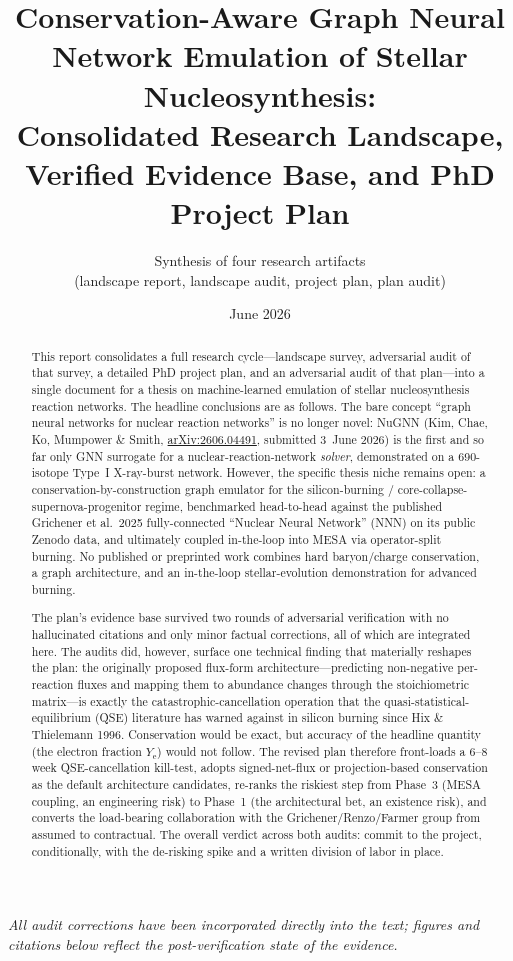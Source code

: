 \documentclass[11pt,a4paper]{article}
\title{\textbf{Conservation-Aware Graph Neural Network Emulation of Stellar Nucleosynthesis:}\\[0.4em]
\large Consolidated Research Landscape, Verified Evidence Base, and PhD Project Plan}
\author{Synthesis of four research artifacts\\
\small (landscape report, landscape audit, project plan, plan audit)}
\date{June 2026}
\newcommand{\Ye}{\ensuremath{Y_{\mathrm{e}}}}
\newcommand{\arxiv}[1]{\href{https://arxiv.org/abs/#1}{arXiv:#1}}
\begin{document}
\maketitle

\begin{center}
\begin{minipage}{0.9\textwidth}
\small\itshape
All audit corrections have been incorporated directly into the text; figures and citations below reflect the post-verification state of the evidence.
\end{minipage}
\end{center}

\begin{abstract}
\noindent
This report consolidates a full research cycle---landscape survey, adversarial audit of that survey, a detailed PhD project plan, and an adversarial audit of that plan---into a single document for a thesis on machine-learned emulation of stellar nucleosynthesis reaction networks. The headline conclusions are as follows. The bare concept ``graph neural networks for nuclear reaction networks'' is no longer novel: NuGNN (Kim, Chae, Ko, Mumpower \& Smith, \arxiv{2606.04491}, submitted 3~June 2026) is the first and so far only GNN surrogate for a nuclear-reaction-network \emph{solver}, demonstrated on a 690-isotope Type~I X-ray-burst network. However, the specific thesis niche remains open: a conservation-by-construction graph emulator for the silicon-burning / core-collapse-supernova-progenitor regime, benchmarked head-to-head against the published Grichener et al.\ 2025 fully-connected ``Nuclear Neural Network'' (NNN) on its public Zenodo data, and ultimately coupled in-the-loop into MESA via operator-split burning. No published or preprinted work combines hard baryon/charge conservation, a graph architecture, and an in-the-loop stellar-evolution demonstration for advanced burning.

The plan's evidence base survived two rounds of adversarial verification with no hallucinated citations and only minor factual corrections, all of which are integrated here. The audits did, however, surface one technical finding that materially reshapes the plan: the originally proposed flux-form architecture---predicting non-negative per-reaction fluxes and mapping them to abundance changes through the stoichiometric matrix---is exactly the catastrophic-cancellation operation that the quasi-statistical-equilibrium (QSE) literature has warned against in silicon burning since Hix \& Thielemann 1996. Conservation would be exact, but accuracy of the headline quantity (the electron fraction \Ye) would not follow. The revised plan therefore front-loads a 6--8 week QSE-cancellation kill-test, adopts signed-net-flux or projection-based conservation as the default architecture candidates, re-ranks the riskiest step from Phase~3 (MESA coupling, an engineering risk) to Phase~1 (the architectural bet, an existence risk), and converts the load-bearing collaboration with the Grichener/Renzo/Farmer group from assumed to contractual. The overall verdict across both audits: commit to the project, conditionally, with the de-risking spike and a written division of labor in place.
\end{abstract}
\end{document}
